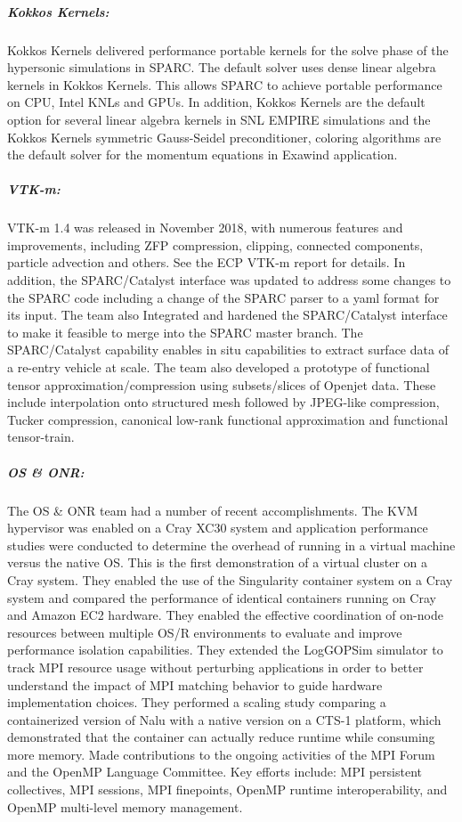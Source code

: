 \subparagraph{Kokkos Kernels:} Kokkos Kernels delivered performance portable kernels for the solve phase of the hypersonic simulations in SPARC. The default solver uses dense linear algebra kernels in Kokkos Kernels. This allows SPARC to achieve portable performance on CPU, Intel KNLs and GPUs. In addition, Kokkos Kernels are the default option for several linear algebra kernels in SNL EMPIRE simulations and the Kokkos Kernels symmetric Gauss-Seidel preconditioner, coloring algorithms are the default solver for the momentum equations in Exawind application. 
 
\subparagraph{VTK-m:} VTK-m 1.4 was released in November 2018, with numerous features and improvements, including ZFP compression, clipping, connected components, particle advection and others.  See the ECP VTK-m report for details.  In addition, the SPARC/Catalyst interface was updated to address some changes to the SPARC code including a change of the SPARC parser to a yaml format for its input.  The team also Integrated and hardened the SPARC/Catalyst interface to make it feasible to merge into the SPARC master branch. The SPARC/Catalyst capability enables in situ capabilities to extract surface data of a re-entry vehicle at scale.  The team also developed a prototype of functional tensor approximation/compression using subsets/slices of Openjet data. These include interpolation onto structured mesh followed by JPEG-like compression, Tucker compression, canonical low-rank functional approximation and functional tensor-train. 

\subparagraph{OS \& ONR:} The OS \& ONR team had a number of recent accomplishments.  The KVM hypervisor was enabled on a Cray XC30 system and application performance studies were conducted to determine the overhead of running in a virtual machine versus the native OS. This is the first demonstration of a virtual cluster on a Cray system.  They enabled the use of the Singularity container system on a Cray system and compared the performance of identical containers running on Cray and Amazon EC2 hardware. They enabled the effective coordination of on-node resources between multiple OS/R environments to evaluate and improve performance isolation capabilities. They extended the LogGOPSim simulator to track MPI resource usage without perturbing applications in order to better understand the impact of MPI matching behavior to guide hardware implementation choices.  They performed a scaling study comparing a containerized version of Nalu with a native version on a CTS-1 platform, which demonstrated that the container can actually reduce runtime while consuming more memory. Made contributions to the ongoing activities of the MPI Forum and the OpenMP Language Committee. Key efforts include: MPI persistent collectives, MPI sessions, MPI finepoints, OpenMP runtime interoperability, and OpenMP multi-level memory management.


